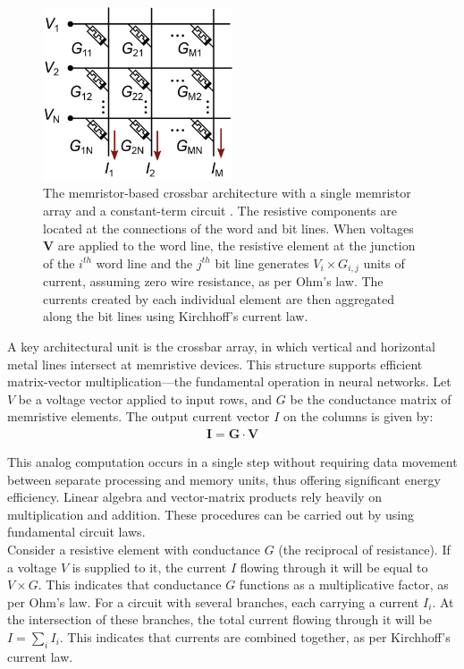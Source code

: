 \begin{figure}[htbp!] 
    \centering    
    \includegraphics[width=0.5\textwidth]{Chapter1/Figs/1h.png}
    \caption[The memristor-based crossbar architecture.]{The memristor-based crossbar architecture with a single memristor array and a constant-term circuit \cite{truong2014new}. The resistive components are located at the connections of the word and bit lines. When voltages $\mathbf{V}$ are applied to the word line, the resistive element at the junction of the $i^{th}$ word line and the $j^{th}$ bit line generates $V_i \times G_{i,j}$ units of current, assuming zero wire resistance, as per Ohm's law. The currents created by each individual element are then aggregated along the bit lines using Kirchhoff's current law.}
    \label{fig:1h}
\end{figure}
    

\noindent A key architectural unit is the crossbar array, in which vertical and horizontal metal lines intersect at memristive devices. This structure supports efficient matrix-vector multiplication—the fundamental operation in neural networks. Let $V$ be a voltage vector applied to input rows, and $G$ be the conductance matrix of memristive elements. The output current vector $I$ on the columns is given by:
\begin{align}
    \mathbf{I} = \mathbf{G} \cdot \mathbf{V} \label{eq:1.30}
\end{align}

\noindent This analog computation occurs in a single step without requiring data movement between separate processing and memory units, thus offering significant energy efficiency. Linear algebra and vector-matrix products rely heavily on multiplication and addition. These procedures can be carried out by using fundamental circuit laws. \\

\noindent Consider a resistive element with conductance $G$ (the reciprocal of resistance). If a voltage $V$ is supplied to it, the current $I$ flowing through it will be equal to $V \times G$. This indicates that conductance $G$ functions as a multiplicative factor, as per Ohm's law. For a circuit with several branches, each carrying a current $I_i$. At the intersection of these branches, the total current flowing through it will be $I = \sum_{i}^{} I_i$. This indicates that currents are combined together, as per Kirchhoff's current law. \\

